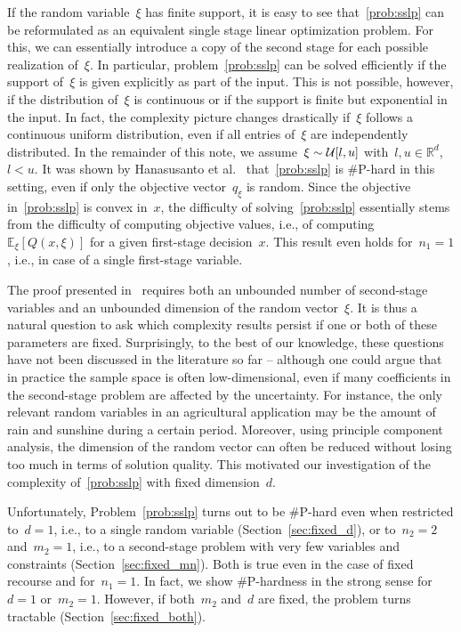 \documentclass{article}
\newcommand{\R}{\mathbb{R}}
\newcommand{\card}{\#}
\newcommand{\E}{\mathbb{E}}
\begin{document}
If the random variable~$\xi$ has finite support, it is easy to see
that~\eqref{prob:sslp} can be reformulated as an equivalent single
stage linear optimization problem. For this, we can essentially
introduce a copy of the second stage for each possible realization
of~$\xi$. In particular, problem~\eqref{prob:sslp} can be solved
efficiently if the support of~$\xi$ is given explicitly as part of the
input. This is not possible, however, if the distribution of~$\xi$ is
continuous or if the support is finite but exponential in the input.
In fact, the complexity picture changes drastically if~$\xi$ follows a
continuous uniform distribution, even if all entries of~$\xi$ are
independently distributed. In the remainder of this note, we
assume~$\xi\sim{\cal U}[l,u]$ with~$l,u\in\R^d$, $l<u$. It was shown
by Hanasusanto et al.\ \cite{Hanasusanto16} that~\eqref{prob:sslp} is
\card P-hard in this setting, even if only the objective
vector~$q_\xi$ is random. Since the objective in~\eqref{prob:sslp} is
convex in~$x$, the difficulty of solving~\eqref{prob:sslp} essentially
stems from the difficulty of computing objective values, i.e., of
computing~$\E_\xi[Q(x,\xi)]$ for a given first-stage
decision~$x$. This result even holds for~$n_1=1$, i.e., in case of a
single first-stage variable.

The proof presented in~\cite{Hanasusanto16} requires both an unbounded
number of second-stage variables and an unbounded dimension of the
random vector~$\xi$.  It is thus a natural question to ask which
complexity results persist if one or both of these parameters are
fixed. Surprisingly, to the best of our knowledge, these questions
have not been discussed in the literature so far -- although one could
argue that in practice the sample space is often low-dimensional, even
if many coefficients in the second-stage problem are affected by the
uncertainty. For instance, the only relevant random variables in an
agricultural application may be the amount of rain and sunshine during
a certain period. Moreover, using principle component analysis, the
dimension of the random vector can often be reduced without losing too
much in terms of solution quality. This motivated our investigation of
the complexity of~\eqref{prob:sslp} with fixed dimension~$d$.

Unfortunately, Problem~\eqref{prob:sslp} turns out to be \card P-hard
even when restricted to~$d=1$, i.e., to a single random variable
(Section~\ref{sec:fixed_d}), or to~$n_2=2$ and~$m_2=1$, i.e., to a
second-stage problem with very few variables and constraints
(Section~\ref{sec:fixed_mn}). Both is true even in the case of fixed
recourse and for~$n_1=1$. In fact, we show \card P-hardness in the
strong sense for~$d=1$ or~$m_2=1$. However, if both~$m_2$ and~$d$ are
fixed, the problem turns tractable (Section~\ref{sec:fixed_both}).
\end{document}
